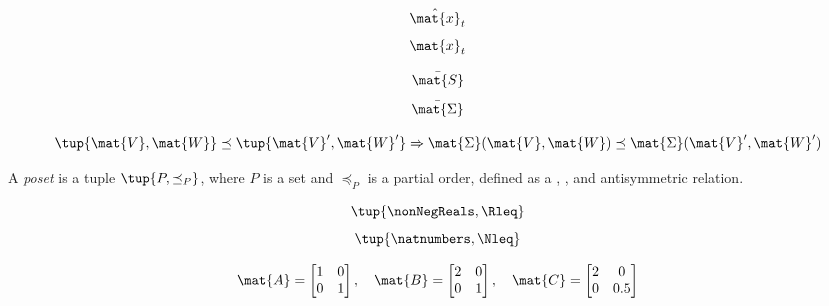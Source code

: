 {\begin{forslides}
        \begin{equation}
            \label{eq:x_estimate}
            \hat{\mat{x}}_t
        \end{equation}
        \begin{equation}
            \label{eq:x_real}
            \mat{x}_t
        \end{equation}

        \begin{equation}
            \label{eq:ric_1}
            \bar{\mat{S}}
        \end{equation}
        \begin{equation}
            \label{eq:ric_2}
            \bar{\mat{\Sigma}}
        \end{equation}

        \begin{equation}
            \label{eq:mon_est}
            \tup{\mat{V},\mat{W}}\preceq \tup{\mat{V}',\mat{W}'} \Rightarrow \mat{\Sigma}(\mat{V},\mat{W})\preceq \mat{\Sigma}(\mat{V}',\mat{W}')
        \end{equation}

        \begin{definition}
            \label{def:poset_cont}
            A \emph{poset} is a tuple $\tup{P,\preceq_P}$, where $P$ is a set and $\preceq_P$ is a partial order, defined as a , , and antisymmetric relation.
        \end{definition}

        \begin{equation}
            \label{eq:posreals}
            \tup{\nonNegReals,\Rleq}
        \end{equation}
        \begin{equation}
            \label{eq:nats}
            \tup{\natnumbers,\Nleq}
        \end{equation}

        \begin{equation}
            \label{eq:matrix_poset}
            \mat{A}=\begin{bmatrix}
                1 & 0 \\0& 1
            \end{bmatrix}, \quad \mat{B}=\begin{bmatrix}
                2 & 0 \\0& 1
            \end{bmatrix},\quad \mat{C}=\begin{bmatrix}
                2 & 0 \\0& 0.5
            \end{bmatrix}
        \end{equation}


\end{forslides}}
